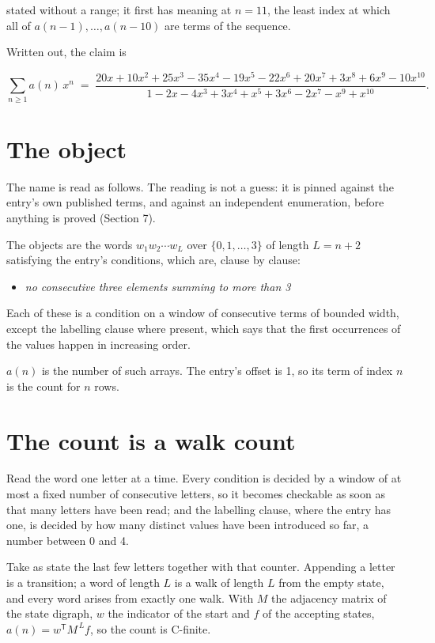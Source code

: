 \documentclass[11pt]{article}
\theoremstyle{definition}
\begin{document}
stated without a range; it first has meaning at $n = 11$, the least index at which all of $a(n-1),\dots,a(n-10)$ are terms of the sequence.

Written out, the claim is

\[\sum_{n \ge 1} a(n)\,x^n \;=\; \frac{20x + 10x^{2} + 25x^{3} - 35x^{4} - 19x^{5} - 22x^{6} + 20x^{7} + 3x^{8} + 6x^{9} - 10x^{10}}{1 - 2x - 4x^{3} + 3x^{4} + x^{5} + 3x^{6} - 2x^{7} - x^{9} + x^{10}}.\]

\section{The object}

The name is read as follows. The reading is not a guess: it is pinned against the entry's own published terms, and against an independent enumeration, before anything is proved (Section 7).

The objects are the words $w_1 w_2 \cdots w_L$ over $\{0,1,\dots,3\}$ of length $L = n + 2$ satisfying the entry's conditions, which are, clause by clause:

\begin{itemize}

\item {\itshape no consecutive three elements summing to more than 3}

\end{itemize}

Each of these is a condition on a window of consecutive terms of bounded width, except the labelling clause where present, which says that the first occurrences of the values happen in increasing order.

$a(n)$ is the number of such arrays. The entry's offset is 1, so its term of index $n$ is the count for $n$ rows.

\section{The count is a walk count}

Read the word one letter at a time. Every condition is decided by a window of at most a fixed number of consecutive letters, so it becomes checkable as soon as that many letters have been read; and the labelling clause, where the entry has one, is decided by how many distinct values have been introduced so far, a number between $0$ and 4.

Take as state the last few letters together with that counter. Appending a letter is a transition; a word of length $L$ is a walk of length $L$ from the empty state, and every word arises from exactly one walk. With $M$ the adjacency matrix of the state digraph, $w$ the indicator of the start and $f$ of the accepting states, $a(n) = w^{\mathsf T}M^{\,L}f$, so the count is C-finite.
\end{document}
